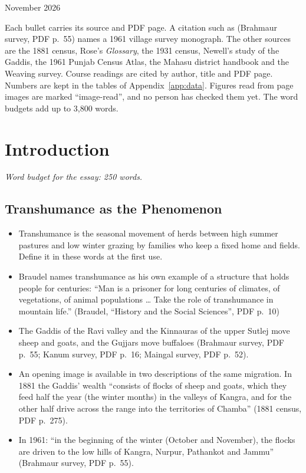 \documentclass[11pt,a4paper]{article}
\newcommand{\cit}[1]{{\small(#1)}}
\newcommand{\budget}[1]{\par\noindent\textit{Word budget for the essay: #1 words.}\par\smallskip}
\newcommand{\Braudel}{Braudel, \enquote{History and the Social Sciences}}
\begin{document}
\par
\smallskip
{}\par
\smallskip
{} November 2026
\bigskip

\noindent Each bullet carries its source and PDF page. A
citation such as \cit{Brahmaur survey, PDF p.~55} names a 1961 village survey
monograph. The other sources are the 1881 census, Rose's \emph{Glossary},
the 1931 census, Newell's study of the Gaddis, the 1961 Punjab Census Atlas,
the Mahasu district handbook and the Weaving survey. Course readings are cited
by author, title and PDF page. Numbers are kept in the tables of
Appendix~\ref{app:data}. Figures read from page images are marked
\enquote{image-read}, and no person has checked them yet. The word budgets
add up to 3,800 words.

\tableofcontents
\bigskip

\section{Introduction}
\budget{250}

\subsection{Transhumance as the Phenomenon}
\begin{itemize}
\item Transhumance is the seasonal movement of herds between high summer
  pastures and low winter grazing by families who keep a fixed home and
  fields. Define it in these words at the first use.
\item Braudel names transhumance as his own example of a structure that holds
  people for centuries: \enquote{Man is a prisoner for long centuries of
  climates, of vegetations, of animal populations \dots{} Take the role of
  transhumance in mountain life.} \cit{\Braudel, PDF p.~10}
\item The Gaddis of the Ravi valley and the Kinnauras of the upper Sutlej move
  sheep and goats, and the Gujjars move buffaloes \cit{Brahmaur survey, PDF
  p.~55; Kanum survey, PDF p.~16; Maingal survey, PDF p.~52}.
\item An opening image is available in two descriptions of the same
  migration. In 1881 the Gaddis' wealth \enquote{consists of flocks of sheep
  and goats, which they feed half the year (the winter months) in the valleys
  of Kangra, and for the other half drive across the range into the
  territories of Chamba} \cit{1881 census, PDF p.~275}.
\item In 1961: \enquote{in the beginning of the winter (October and November),
  the flocks are driven to the low hills of Kangra, Nurpur, Pathankot and
  Jammu} \cit{Brahmaur survey, PDF p.~55}.
\end{itemize}
\end{document}
